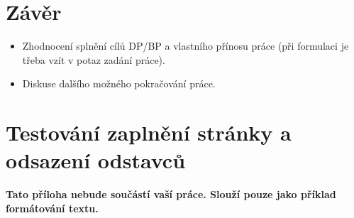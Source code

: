 \documentclass[11pt,oneside,a4paper]{book}
\begin{document}
\chapter{Závěr}

\begin{itemize}
\item Zhodnocení splnění cílů DP/BP a  vlastního přínosu práce (při formulaci je třeba vzít v potaz zadání práce).
\item Diskuse dalšího možného pokračování práce.
\end{itemize} 


%




%
{
\def\CS{$\cal C\kern-0.1667em\lower.5ex\hbox{$\cal S$}\kern-0.075em $}

}

%

\appendix

\chapter{Testování zaplnění stránky a odsazení odstavců}
\textbf{\large Tato příloha nebude součástí vaší práce. 
Slouží pouze jako příklad formátování textu.}
\end{document}
